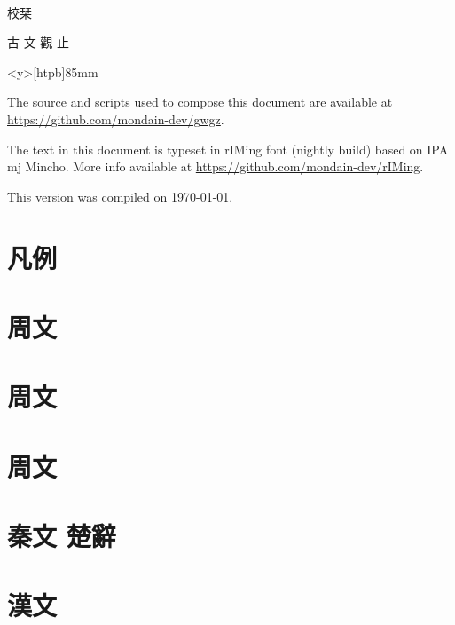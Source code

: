 \documentclass[openany,a5paper]{utbook}
\begin{document}
\thispagestyle{empty}
~\vfill{\it{\Large\parbox{1zw}{校栞}}\quad\Huge 古 文 觀 止\par}\vfill
\newpage\thispagestyle{empty}
\begin{minipage}<y>[htpb]{85mm}
\vspace{12cm}
{\parskip=5pt \tiny The source and scripts used to compose this document are available at \url{https://github.com/mondain-dev/gwgz}. 

The text in this document is typeset in rIMing font (nightly build) based on IPA mj Mincho. More info available at \url{https://github.com/mondain-dev/rIMing}. 

This version was compiled on \today.\par
}
\end{minipage}

\frontmatter
\renewcommand\thepage{\rensuji{\roman{page}}\relax}
\begin{multicols}{2}
\tableofcontents
\end{multicols}

\chapter{凡例}

\mainmatter
\renewcommand\thepage{\zhdigits{\arabic{page}}\relax}
\chapter[{\small 周文}]{周文}


\chapter[{\small 周文}]{周文}


\chapter[{\small 周文}]{周文}


\chapter[{\small 秦文 楚辭}]{秦文 楚辭}


\chapter[{\small 漢文}]{漢文}

\end{document}
